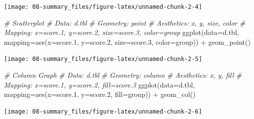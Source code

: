 \documentclass[
]{book}
\newenvironment{Shaded}{\begin{snugshade}}{\end{snugshade}}
\newcommand{\AttributeTok}[1]{\textcolor[rgb]{0.77,0.63,0.00}{#1}}
\newcommand{\CommentTok}[1]{\textcolor[rgb]{0.56,0.35,0.01}{\textit{#1}}}
\newcommand{\FloatTok}[1]{\textcolor[rgb]{0.00,0.00,0.81}{#1}}
\newcommand{\FunctionTok}[1]{\textcolor[rgb]{0.00,0.00,0.00}{#1}}
\newcommand{\NormalTok}[1]{#1}
\newcommand{\SpecialCharTok}[1]{\textcolor[rgb]{0.00,0.00,0.00}{#1}}
\begin{document}
\begin{center}\texttt{[image: 08-summary\_files/figure-latex/unnamed-chunk-2-4]} \end{center}

\begin{Shaded}
\begin{Highlighting}[]
\CommentTok{\# Scatterplot}
\CommentTok{\#   Data: d.tbl}
\CommentTok{\#   Geometry: point}
\CommentTok{\#   Aesthetics: x, y, size, color}
\CommentTok{\#   Mapping: x=score.1, y=score.2, size=score.3, color=group}
\FunctionTok{ggplot}\NormalTok{(}\AttributeTok{data=}\NormalTok{d.tbl, }
       \AttributeTok{mapping=}\FunctionTok{aes}\NormalTok{(}\AttributeTok{x=}\NormalTok{score}\FloatTok{.1}\NormalTok{, }\AttributeTok{y=}\NormalTok{score}\FloatTok{.2}\NormalTok{, }\AttributeTok{size=}\NormalTok{score}\FloatTok{.3}\NormalTok{, }\AttributeTok{color=}\NormalTok{group)) }\SpecialCharTok{+} 
  \FunctionTok{geom\_point}\NormalTok{()}
\end{Highlighting}
\end{Shaded}

\begin{center}\texttt{[image: 08-summary\_files/figure-latex/unnamed-chunk-2-5]} \end{center}

\begin{Shaded}
\begin{Highlighting}[]
\CommentTok{\# Column Graph}
\CommentTok{\#   Data: d.tbl}
\CommentTok{\#   Geometry: column}
\CommentTok{\#   Aesthetics: x, y, fill}
\CommentTok{\#   Mapping: x=score.1, y=score.2, fill=score.3}
\FunctionTok{ggplot}\NormalTok{(}\AttributeTok{data=}\NormalTok{d.tbl, }\AttributeTok{mapping=}\FunctionTok{aes}\NormalTok{(}\AttributeTok{x=}\NormalTok{score}\FloatTok{.1}\NormalTok{, }\AttributeTok{y=}\NormalTok{score}\FloatTok{.2}\NormalTok{, }\AttributeTok{fill=}\NormalTok{group)) }\SpecialCharTok{+} 
  \FunctionTok{geom\_col}\NormalTok{()}
\end{Highlighting}
\end{Shaded}

\begin{center}\texttt{[image: 08-summary\_files/figure-latex/unnamed-chunk-2-6]} \end{center}
\end{document}
